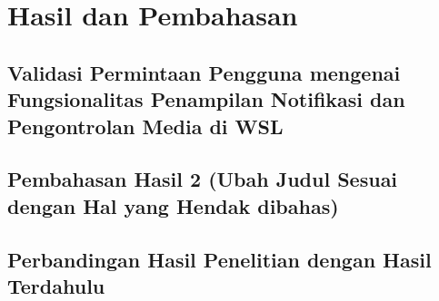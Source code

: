 \chapter{Hasil dan Pembahasan}

\section{Validasi Permintaan Pengguna mengenai Fungsionalitas Penampilan Notifikasi dan Pengontrolan Media di WSL}

\section{Pembahasan Hasil 2 (Ubah Judul Sesuai dengan Hal yang Hendak dibahas)}


\section{Perbandingan Hasil Penelitian dengan Hasil Terdahulu}
